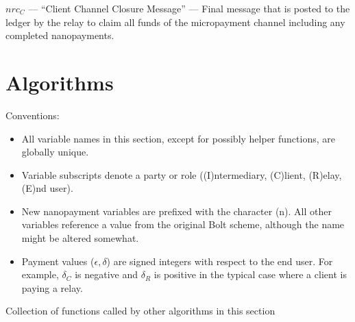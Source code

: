 \documentclass{article}
\begin{document}
$nrc_C$ --- ``Client Channel Closure Message'' --- Final message that is
posted to the ledger by the relay to claim all funds of the
micropayment channel including any completed nanopayments.

\section{Algorithms}\label{algorithms}

Conventions:
\begin{itemize}
\item All variable names in this section, except for possibly helper
  functions, are globally unique.
\item Variable subscripts denote a party or role ((I)ntermediary,
  (C)lient, (R)elay, (E)nd user).
\item New nanopayment variables are prefixed with the character
  (n). All other variables reference a value from the original Bolt
  scheme, although the name might be altered somewhat.
\item Payment values ($\epsilon, \delta$) are signed integers with
  respect to the end user. For example, $\delta_C$ is negative and
  $\delta_R$ is positive in the typical case where a client is paying
  a relay.
\end{itemize}

\begin{algorithm}
  \begin{algorithmic}[1]
    \caption{Collection of functions called by other algorithms in this section}
    \EndFunction{}
    \EndFor{}
    \EndFunction{}

     
    \EndFor{}
    \EndIf{}
    \EndFunction{}

  \end{algorithmic}
\end{algorithm}
\end{document}

